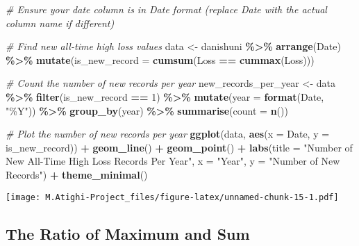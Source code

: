 \documentclass[
  12pt,
]{article}
\newenvironment{Shaded}{\begin{snugshade}}{\end{snugshade}}
\newcommand{\AttributeTok}[1]{\textcolor[rgb]{0.13,0.29,0.53}{#1}}
\newcommand{\CommentTok}[1]{\textcolor[rgb]{0.56,0.35,0.01}{\textit{#1}}}
\newcommand{\DecValTok}[1]{\textcolor[rgb]{0.00,0.00,0.81}{#1}}
\newcommand{\FunctionTok}[1]{\textcolor[rgb]{0.13,0.29,0.53}{\textbf{#1}}}
\newcommand{\NormalTok}[1]{#1}
\newcommand{\OtherTok}[1]{\textcolor[rgb]{0.56,0.35,0.01}{#1}}
\newcommand{\SpecialCharTok}[1]{\textcolor[rgb]{0.81,0.36,0.00}{\textbf{#1}}}
\newcommand{\StringTok}[1]{\textcolor[rgb]{0.31,0.60,0.02}{#1}}
\begin{document}
\begin{Shaded}
\begin{Highlighting}[]
\CommentTok{\# Ensure your date column is in Date format (replace \textquotesingle{}Date\textquotesingle{} with the actual column name if different)}

\CommentTok{\# Find new all{-}time high loss values}
\NormalTok{data }\OtherTok{\textless{}{-}}\NormalTok{ danishuni }\SpecialCharTok{\%\textgreater{}\%}
  \FunctionTok{arrange}\NormalTok{(Date) }\SpecialCharTok{\%\textgreater{}\%}
  \FunctionTok{mutate}\NormalTok{(}\AttributeTok{is\_new\_record =} \FunctionTok{cumsum}\NormalTok{(Loss }\SpecialCharTok{==} \FunctionTok{cummax}\NormalTok{(Loss)))}

\CommentTok{\# Count the number of new records per year}
\NormalTok{new\_records\_per\_year }\OtherTok{\textless{}{-}}\NormalTok{ data }\SpecialCharTok{\%\textgreater{}\%}
  \FunctionTok{filter}\NormalTok{(is\_new\_record }\SpecialCharTok{==} \DecValTok{1}\NormalTok{) }\SpecialCharTok{\%\textgreater{}\%}
  \FunctionTok{mutate}\NormalTok{(}\AttributeTok{year =} \FunctionTok{format}\NormalTok{(Date, }\StringTok{"\%Y"}\NormalTok{)) }\SpecialCharTok{\%\textgreater{}\%}
  \FunctionTok{group\_by}\NormalTok{(year) }\SpecialCharTok{\%\textgreater{}\%}
  \FunctionTok{summarise}\NormalTok{(}\AttributeTok{count =} \FunctionTok{n}\NormalTok{())}

\CommentTok{\# Plot the number of new records per year}
\FunctionTok{ggplot}\NormalTok{(data, }\FunctionTok{aes}\NormalTok{(}\AttributeTok{x =}\NormalTok{ Date, }\AttributeTok{y =}\NormalTok{ is\_new\_record)) }\SpecialCharTok{+}
  \FunctionTok{geom\_line}\NormalTok{() }\SpecialCharTok{+}
  \FunctionTok{geom\_point}\NormalTok{() }\SpecialCharTok{+}
  \FunctionTok{labs}\NormalTok{(}\AttributeTok{title =} \StringTok{"Number of New All{-}Time High Loss Records Per Year"}\NormalTok{,}
       \AttributeTok{x =} \StringTok{"Year"}\NormalTok{,}
       \AttributeTok{y =} \StringTok{"Number of New Records"}\NormalTok{) }\SpecialCharTok{+}
  \FunctionTok{theme\_minimal}\NormalTok{()}
\end{Highlighting}
\end{Shaded}

\texttt{[image: M.Atighi-Project\_files/figure-latex/unnamed-chunk-15-1.pdf]}

\subsection{The Ratio of Maximum and
Sum}\label{the-ratio-of-maximum-and-sum}
\end{document}
